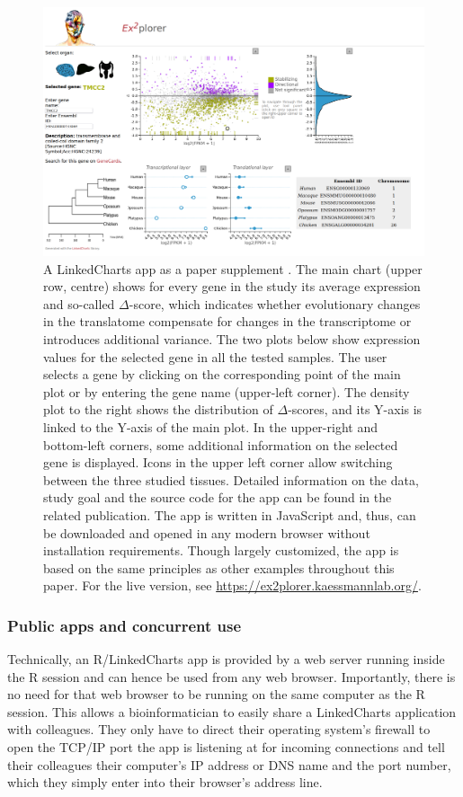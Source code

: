 \documentclass[twocolumn,10pt]{article}
\begin{document}
\begin{figure}[t]
   \includegraphics[width=\textwidth]{FigF/figF.png}
   \caption{A LinkedCharts app as a paper supplement \cite{wang_2020}. The main chart (upper row, centre) shows for every gene in the study its average expression and so-called $\Delta$-score, which indicates whether evolutionary changes in the translatome compensate for changes in the transcriptome or introduces additional variance. The two plots below show expression values for the selected gene in all the tested samples. The user selects a gene by clicking on the corresponding point of the main plot or by entering the gene name (upper-left corner). The density plot to the right shows the distribution of $\Delta$-scores, and its Y-axis is linked to the Y-axis of the main plot. In the upper-right and bottom-left corners, some additional information on the selected gene is displayed. Icons in the upper left corner allow switching between the three studied tissues. Detailed information on the data, study goal and the source code for the app can be found in the related publication. The app is written in JavaScript and, thus, can be downloaded and opened in any modern browser without installation requirements. Though largely customized, the app is based on the same principles as other examples throughout this paper. For the live version, see \url{https://ex2plorer.kaessmannlab.org/}.}
   \label{FigF}
\end{figure}

\subsubsection{Public apps and concurrent use}

Technically, an R/LinkedCharts app is provided by a web server running inside the R session and can hence be used from any web browser. Importantly, there is no need for that web browser to be running on the same computer as the R session. This allows a bioinformatician to easily share a LinkedCharts application with colleagues. They only have to direct their operating system's firewall to open the TCP/IP port the app is listening at for incoming connections and tell their colleagues their computer's IP address or DNS name and the port number, which they simply enter into their browser's address line.
\end{document}
